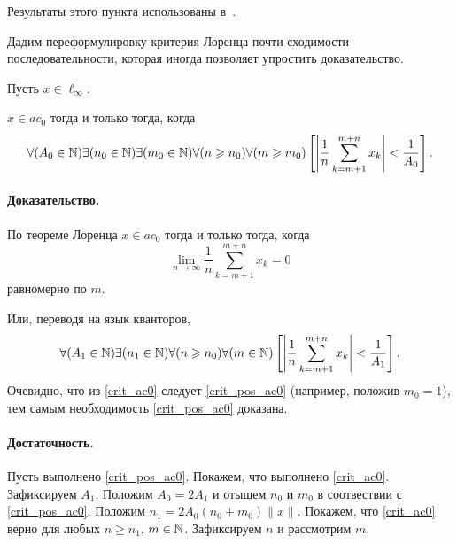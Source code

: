 Результаты этого пункта использованы в~\cite{our-mz2019ac0}.

Дадим переформулировку критерия Лоренца
\cite{lorentz1948contribution,bennett1974consistency}
почти сходимости последовательности,
которая иногда позволяет упростить доказательство.


\begin{theorem}
	\label{thm:Lorentz_mod}
	Пусть $x\in\ell_\infty$.

	$x\in ac_0$ тогда и только тогда, когда
	\begin{equation}\label{crit_pos_ac0}
		\forall(A_0\in\N)
		\exists(n_0\in\N)
		\exists(m_0\in\N)
		\forall(n\geq n_0)
		\forall(m\geq m_0)
		\\
		\left[
			\left|
			\frac{1}{n}
			\sum_{k=m+1}^{m+n} x_k
			\right|
			<
			\frac{1}{A_0}
		\right]
		.
	\end{equation}

\end{theorem}

\paragraph{Доказательство.}
По теореме Лоренца $x\in ac_0$ тогда и только тогда, когда
\begin{equation}\label{Lorencz_ac0}
	\lim_{n\to\infty} \frac{1}{n} \sum_{k=m+1}^{m+n} x_k = 0
\end{equation}
равномерно по $m$.

Или, переводя на язык кванторов,
\begin{equation}\label{crit_ac0}
	\forall(A_1\in\N)
	\exists(n_1\in\N)
	\forall(n\geq n_0)
	\forall(m \in \N)
	\\
	\left[
		\left|
		\frac{1}{n}
		\sum_{k=m+1}^{m+n} x_k
		\right|
		<
		\frac{1}{A_1}
	\right]
	.
\end{equation}
Очевидно, что из \eqref{crit_ac0} следует \eqref{crit_pos_ac0} (например, положив $m_0 = 1$),
тем самым необходимость \eqref{crit_pos_ac0} доказана.

\paragraph{Достаточность.}
Пусть выполнено \eqref{crit_pos_ac0}.
Покажем, что выполнено \eqref{crit_ac0}.
Зафиксируем $A_1$.
Положим $A_0 = 2A_1$ и отыщем $n_0$ и $m_0$ в соотвествии с \eqref{crit_pos_ac0}.
Положим $n_1 = 2A_0(n_0+m_0)\|x\|$.
Покажем, что \eqref{crit_ac0} верно для любых $n\geq n_1$, $m\in \N$.
Зафиксируем $n$ и рассмотрим $m$.


